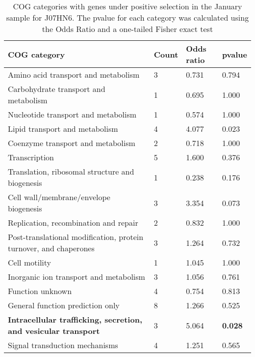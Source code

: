 \begin{table}[]
\footnotesize 
	\tabcolsep=0.11cm 
\caption{COG categories with genes under positive selection in the January sample for J07HN6. The pvalue for each category was calculated using the Odds Ratio and a one-tailed Fisher exact test \\} 
\begin{tabularx}{\textwidth}{L{6cm}R{2cm}R{2cm}R{2cm}} 
\hline 
\textbf{COG category} & \textbf{Count} & \textbf{Odds ratio} & \textbf{pvalue} \\ 
\hline 
Amino acid transport and metabolism & 3 & 0.731 & 0.794 \\ 
Carbohydrate transport and metabolism & 1 & 0.695 & 1.000 \\ 
Nucleotide transport and metabolism & 1 & 0.574 & 1.000 \\ 
Lipid transport and metabolism & 4 & 4.077 & 0.023 \\ 
Coenzyme transport and metabolism & 2 & 0.718 & 1.000 \\ 
Transcription & 5 & 1.600 & 0.376 \\ 
Translation, ribosomal structure and biogenesis & 1 & 0.238 & 0.176 \\ 
Cell wall/membrane/envelope biogenesis & 3 & 3.354 & 0.073 \\ 
Replication, recombination and repair & 2 & 0.832 & 1.000 \\ 
Post-translational modification, protein turnover, and chaperones & 3 & 1.264 & 0.732 \\ 
Cell motility & 1 & 1.045 & 1.000 \\ 
Inorganic ion transport and metabolism & 3 & 1.056 & 0.761 \\ 
Function unknown & 4 & 0.754 & 0.813 \\ 
General function prediction only & 8 & 1.266 & 0.525 \\ 
\textbf{Intracellular trafficking, secretion, and vesicular transport} & 3 & 5.064 & \textbf{0.028} \\ 
Signal transduction mechanisms & 4 & 1.251 & 0.565 \\ 
\end{tabularx} 
\label{January_COG_Selection_J07HN6} 
 \end{table} 

